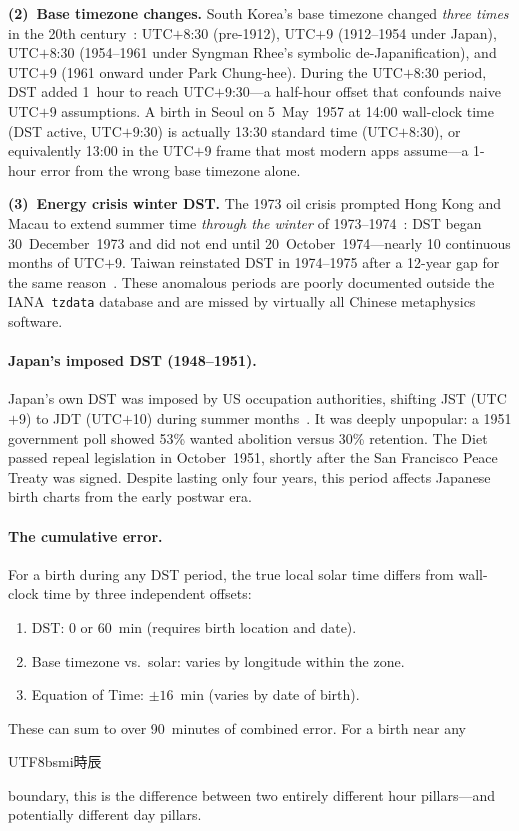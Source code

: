 \documentclass[10pt,a4paper]{article}
\newcommand{\zh}[1]{\begin{CJK}{UTF8}{bsmi}#1\end{CJK}}
\begin{document}
\textbf{(2)~Base timezone changes.}
South Korea's base timezone changed \emph{three times} in the 20th
century~\cite{korea_tz_history, iana_tzdata_asia}:
UTC$+$8:30 (pre-1912), UTC$+$9 (1912--1954 under Japan), UTC$+$8:30
(1954--1961 under Syngman Rhee's symbolic de-Japanification), and
UTC$+$9 (1961 onward under Park Chung-hee).  During the UTC$+$8:30
period, DST added 1~hour to reach UTC$+$9:30---a half-hour offset
that confounds naive UTC$+$9 assumptions.  A birth in Seoul on
5~May~1957 at 14:00 wall-clock time (DST active, UTC$+$9:30) is
actually 13:30 standard time (UTC$+$8:30), or equivalently 13:00 in
the UTC$+$9 frame that most modern apps assume---a 1-hour error from
the wrong base timezone alone.

\textbf{(3)~Energy crisis winter DST.}
The 1973 oil crisis prompted Hong Kong and Macau to extend summer time
\emph{through the winter} of 1973--1974~\cite{hko_summertime,
wetoasthk_dst}: DST began 30~December~1973 and did not end until
20~October~1974---nearly 10 continuous months of UTC$+$9.  Taiwan
reinstated DST in 1974--1975 after a 12-year gap for the same
reason~\cite{iana_tzdata_asia}.  These anomalous periods are poorly
documented outside the IANA~\texttt{tzdata} database and are missed by
virtually all Chinese metaphysics software.

\paragraph{Japan's imposed DST (1948--1951).}
Japan's own DST was imposed by US occupation authorities, shifting JST
(UTC$+$9) to JDT (UTC$+$10) during summer
months~\cite{japan_dst_abolition, iana_tzdata_asia}.  It was deeply
unpopular: a 1951 government poll showed 53\% wanted abolition versus
30\% retention.  The Diet passed repeal legislation in October~1951,
shortly after the San Francisco Peace Treaty was signed.  Despite
lasting only four years, this period affects Japanese birth charts from
the early postwar era.

\paragraph{The cumulative error.}
For a birth during any DST period, the true local solar time
differs from wall-clock time by three independent offsets:
\begin{enumerate}[nosep]
  \item DST: 0 or 60~min (requires birth location and date).
  \item Base timezone vs.\ solar: varies by longitude within the zone.
  \item Equation of Time: $\pm 16$~min (varies by date of birth).
\end{enumerate}
These can sum to over 90~minutes of combined error.  For a birth near
any \zh{時辰} boundary, this is the difference between two entirely
different hour pillars---and potentially different day pillars.
\end{document}
